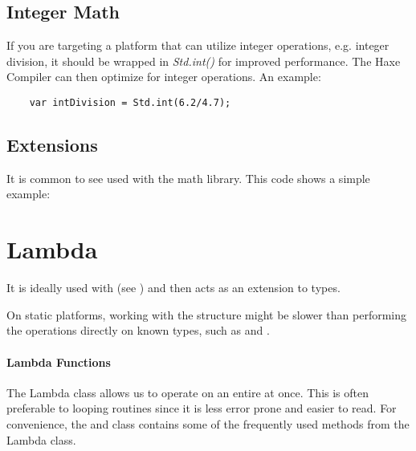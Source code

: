 \subsection{Integer Math}
\label{std-math-integer-math}

If you are targeting a platform that can utilize integer operations, e.g. integer division, it should be wrapped in \emph{Std.int()} for improved performance.  The Haxe Compiler can then optimize for integer operations.  An example:

\begin{lstlisting}
	var intDivision = Std.int(6.2/4.7);
\end{lstlisting}


\subsection{Extensions}
\label{std-math-extensions}
It is common to see  used with the math library.  This code shows a simple example:  


\section{Lambda}
\label{std-Lambda}


It is ideally used with  (see ) and then acts as an extension to  types. 

On static platforms, working with the  structure might be slower than performing the operations directly on known types, such as  and .

\paragraph{Lambda Functions}
The Lambda class allows us to operate on an entire  at once.
This is often preferable to looping routines since it is less error prone and easier to read. 
For convenience, the  and  class contains some of the frequently used methods from the Lambda class.

